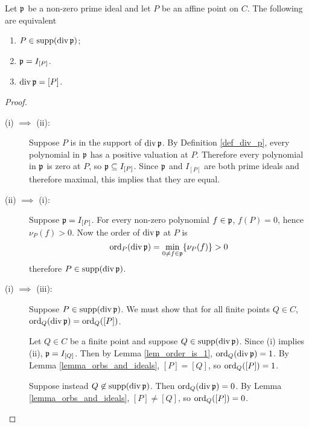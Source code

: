 \begin{proposition}
  \label{prop_prime_ideals_prime_divisors}
  Let $\frak p$ be a non-zero prime ideal and let $P$ be an affine point on $C$.
  The following are equivalent
  \begin{enumerate}[label=(\roman*)]
    \item $P \in \supp(\div \frak p)$;
    \item $\frak p = I_{[P]}$.
    \item $\div \frak p = [P]$.
  \end{enumerate}
\end{proposition}
\begin{proof}
  \begin{description}
    \item [(i) $\implies$ (ii):]
      Suppose $P$ is in the support of $\div \frak p$.
      By Definition \ref{def_div_p}, every polynomial in $\frak p$ has a positive valuation at $P$.
      Therefore every polynomial in $\frak p$ is zero at $P$, so $\frak p \subseteq I_{[P]}$.
      Since $\frak p$ and $I_{[P]}$ are both prime ideals and therefore maximal, this implies that they are equal.

    \item [(ii) $\implies$ (i):]
      Suppose $\frak p = I_{[P]}$.
      For every non-zero polynomial $f \in \frak p$, $f(P) = 0$, hence $\nu_P(f) > 0$.
      Now the order of $\div \frak p$ at $P$ is
      \[ \ord_P(\div \frak p) = \min_{0 \neq f \in \frak p}\{ \nu_P(f) \} > 0 \]
      therefore $P \in \supp(\div \frak p)$.

    \item [(i) $\implies$ (iii):]
      Suppose $P \in \supp(\div \frak p)$.
      We must show that for all finite points $Q \in C$, $\ord_Q(\div \frak p) = \ord_Q([P])$.
      
      Let $Q \in C$ be a finite point and suppose $Q \in \supp(\div \frak p)$.
      Since (i) implies (ii), $\frak p = I_{[Q]}$.
      Then by Lemma \ref{lem_order_is_1}, $\ord_Q(\div \frak p) = 1$.
      By Lemma \ref{lemma_orbs_and_ideals}, $[P] = [Q]$, so $\ord_Q([P]) = 1$.
      
      Suppose instead $Q \not \in \supp(\div \frak p)$.
      Then $\ord_Q(\div \frak p) = 0$.
      By Lemma \ref{lemma_orbs_and_ideals}, $[P] \neq [Q]$, so $\ord_Q([P]) = 0$.
\begin{comment}
    \item [(ii) $\implies$ (iii):]
      Suppose $\frak p = I_{[P]}$.
      Since (ii) implies (i), $P \in \supp(\div\frak p)$.
      For every $\sigma \in \Gal(\bar K/K)$, $I_{[P]} = I_{[\sigma(P)]}$,
      so for every $\sigma \in \Gal(\bar K/K)$,  $\sigma(P) \in \supp(\div \frak p)$.
      Therefore the entire orbit of $P$ is in $\supp(\div \frak p)$ and $[P] \leq \div \frak p$.
      

\end{comment}
\end{description}
\end{proof}
